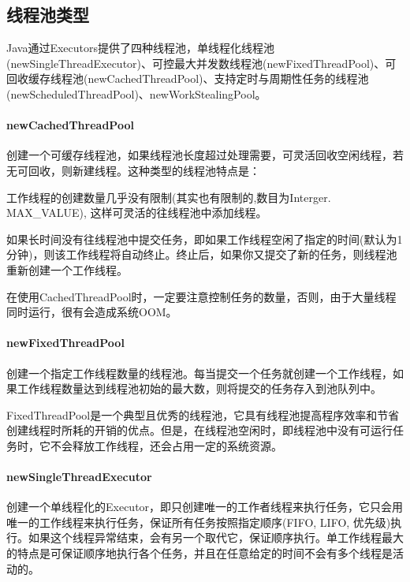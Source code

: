 \documentclass[../../../interview-questions.tex]{subfiles}
\begin{document}
\subsection{线程池类型}

Java通过Executors提供了四种线程池，单线程化线程池(newSingleThreadExecutor)、可控最大并发数线程池(newFixedThreadPool)、可回收缓存线程池(newCachedThreadPool)、支持定时与周期性任务的线程池(newScheduledThreadPool)、newWorkStealingPool。

\paragraph{newCachedThreadPool}

创建一个可缓存线程池，如果线程池长度超过处理需要，可灵活回收空闲线程，若无可回收，则新建线程。这种类型的线程池特点是：

工作线程的创建数量几乎没有限制(其实也有限制的,数目为Interger. MAX\_VALUE), 这样可灵活的往线程池中添加线程。

如果长时间没有往线程池中提交任务，即如果工作线程空闲了指定的时间(默认为1分钟)，则该工作线程将自动终止。终止后，如果你又提交了新的任务，则线程池重新创建一个工作线程。

在使用CachedThreadPool时，一定要注意控制任务的数量，否则，由于大量线程同时运行，很有会造成系统OOM。

\paragraph{newFixedThreadPool}

创建一个指定工作线程数量的线程池。每当提交一个任务就创建一个工作线程，如果工作线程数量达到线程池初始的最大数，则将提交的任务存入到池队列中。

FixedThreadPool是一个典型且优秀的线程池，它具有线程池提高程序效率和节省创建线程时所耗的开销的优点。但是，在线程池空闲时，即线程池中没有可运行任务时，它不会释放工作线程，还会占用一定的系统资源。

\paragraph{newSingleThreadExecutor}

创建一个单线程化的Executor，即只创建唯一的工作者线程来执行任务，它只会用唯一的工作线程来执行任务，保证所有任务按照指定顺序(FIFO, LIFO, 优先级)执行。如果这个线程异常结束，会有另一个取代它，保证顺序执行。单工作线程最大的特点是可保证顺序地执行各个任务，并且在任意给定的时间不会有多个线程是活动的。
\end{document}
